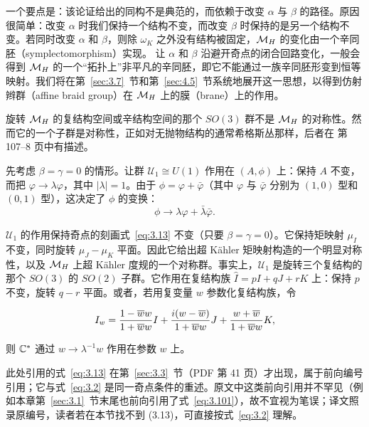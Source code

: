 一个要点是：该论证给出的同构不是典范的，而依赖于改变 $\alpha$ 与 $\beta$ 的路径。原因很简单：改变 $\alpha$ 时我们保持一个结构不变，而改变 $\beta$ 时保持的是另一个结构不变。若同时改变 $\alpha$ 和 $\beta$，则除 $\omega_K$ 之外没有结构被固定，$\MH$ 的变化由一个辛同胚（symplectomorphism）实现。
让 $\alpha$ 和 $\beta$ 沿避开奇点的闭合回路变化，一般会得到 $\MH$ 的一个“拓扑上”非平凡的辛同胚，即它不能通过一族辛同胚形变到恒等映射。我们将在第~\ref{sec:3.7}~节和第~\ref{sec:4.5}~节系统地展开这一思想，以得到仿射辫群（affine braid group）在 $\MH$ 上的膜（brane）上的作用。

\bigskip{}

旋转 $\MH$ 的复结构空间或辛结构空间的那个 $SO(3)$ 群不是 $\MH$ 的对称性。然而它的一个子群是对称性，正如对无抛物结构的通常希格斯丛那样，后者在 \cite{ref21} 第 107--8 页中有描述。

先考虑 $\beta=\gamma=0$ 的情形。让群
${\mathcal U}_1\cong U(1)$ 作用在 $(A,\phi)$ 上：保持 $A$ 不变，而把 $\varphi\to\lambda\varphi$，其中 $|\lambda|=1$。由于 $\phi=\varphi+\bar\varphi$（其中 $\varphi$ 与 $\bar\varphi$
分别为 $(1,0)$ 型和 $(0,1)$ 型），这决定了 $\phi$ 的变换：
\setcounter{equation}{10}
\begin{equation}\label{eq:3.11}
  \phi\to\lambda \varphi+\bar\lambda
\bar\varphi.
\end{equation}

   ${\mathcal U}_1$ 的作用保持奇点的刻画式~\eqref{eq:3.13} 不变（只要 $\beta=\gamma=0$）。它保持矩映射 $\mu_I$ 不变，同时旋转
$\mu_J-\mu_K$ 平面。因此它给出超 Kähler 矩映射构造的一个明显对称性，以及 $\MH$ 上超 Kähler 度规的一个对称群。事实上，${\mathcal U}_1$ 是旋转三个复结构的那个 $SO(3)$ 的 $SO(2)$ 子群。它作用在复结构族 $\hat I=pI+qJ+rK$ 上：保持 $p$ 不变，旋转
$q-r$ 平面。或者，若用复变量 $w$ 参数化复结构族，令

\setcounter{equation}{11}
\begin{equation}\label{eq:3.12}
  I_w={1-\bar w w\over 1+\bar w
w}I+{i(w-\bar w)\over 1+\bar w w}J+{w+\bar w\over 1+\bar w w}K,
\end{equation}

则 $\C^*$ 通过 $w\to\lambda^{-1}w$ 作用在参数 $w$ 上。

\begin{yizhu}[易错点]
此处引用的式~\eqref{eq:3.13} 在第~\ref{sec:3.3}~节（PDF 第 41 页）才出现，属于前向编号引用；它与式~\eqref{eq:3.2} 是同一奇点条件的重述。原文中这类前向引用并不罕见（例如本章第~\ref{sec:3.1}~节末尾也前向引用了式~\eqref{eq:3.101}），故不宜视为笔误；译文照录原编号，读者若在本节找不到 (3.13)，可直接按式~\eqref{eq:3.2} 理解。
\end{yizhu}

